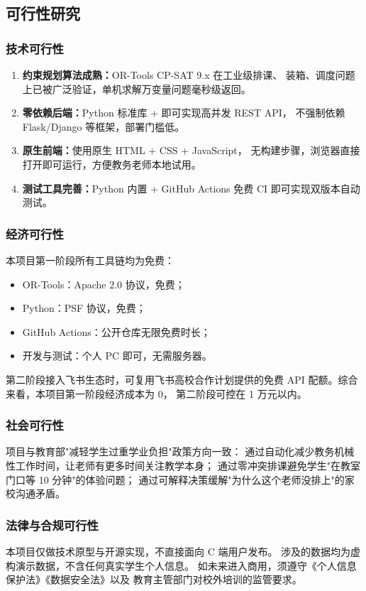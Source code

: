 \subsection{可行性研究}

\subsubsection{技术可行性}

\begin{enumerate}[leftmargin=2em,itemsep=0.2em]
\item \textbf{约束规划算法成熟：}OR-Tools CP-SAT 9.x 在工业级排课、
装箱、调度问题上已被广泛验证，单机求解万变量问题毫秒级返回。
\item \textbf{零依赖后端：}Python 标准库  +
 即可实现高并发 REST API，
不强制依赖 Flask/Django 等框架，部署门槛低。
\item \textbf{原生前端：}使用原生 HTML + CSS + JavaScript，
无构建步骤，浏览器直接打开即可运行，方便教务老师本地试用。
\item \textbf{测试工具完善：}Python 内置  + GitHub Actions
免费 CI 即可实现双版本自动测试。
\end{enumerate}

\subsubsection{经济可行性}

本项目第一阶段所有工具链均为免费：
\begin{itemize}[leftmargin=2em,itemsep=0.1em]
\item OR-Tools：Apache 2.0 协议，免费；
\item Python：PSF 协议，免费；
\item GitHub Actions：公开仓库无限免费时长；
\item 开发与测试：个人 PC 即可，无需服务器。
\end{itemize}
第二阶段接入飞书生态时，可复用飞书高校合作计划提供的免费
API 配额。综合来看，本项目第一阶段经济成本为 0，
第二阶段可控在 1 万元以内。

\subsubsection{社会可行性}

项目与教育部"减轻学生过重学业负担"政策方向一致：
通过自动化减少教务机械性工作时间，让老师有更多时间关注教学本身；
通过零冲突排课避免学生"在教室门口等 10 分钟"的体验问题；
通过可解释决策缓解"为什么这个老师没排上"的家校沟通矛盾。

\subsubsection{法律与合规可行性}

本项目仅做技术原型与开源实现，不直接面向 C 端用户发布。
涉及的数据均为虚构演示数据，不含任何真实学生个人信息。
如未来进入商用，须遵守《个人信息保护法》《数据安全法》以及
教育主管部门对校外培训的监管要求。
